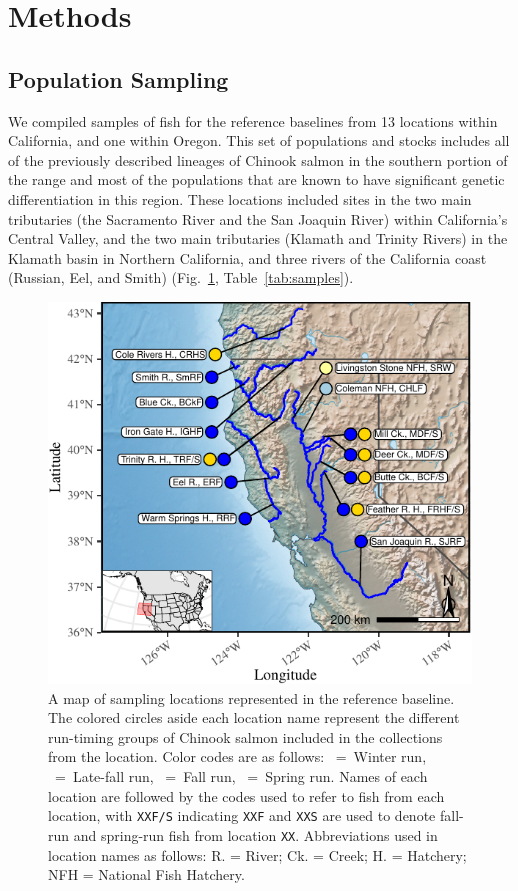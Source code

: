  \section*{Methods}

\subsection*{Population Sampling}

We compiled samples of fish for the reference baselines from 13 locations within California, and one
within Oregon. This set of populations and stocks includes all of the previously described lineages of Chinook salmon in the southern portion of the range and most of the populations that are known to have significant genetic differentiation in this region.
These locations included sites in the two
main tributaries (the Sacramento River and the San Joaquin River) within
California's Central Valley, and the two main tributaries (Klamath and Trinity Rivers) in the Klamath basin in Northern California, and
three rivers of the California coast (Russian, Eel, and Smith)
(Fig.~\ref{fig:map}, Table~\ref{tab:samples}).
\begin{figure}
\newcommand{\mapcap}{\footnotesize  A map of sampling locations represented in the reference
baseline.  The colored circles aside
each location name represent the different run-timing groups of Chinook salmon
included in the collections from the location.  Color codes are as follows: \Wball~=~Winter run,
\LFball{}~=~Late-fall run, \Fball~=~Fall run, \Sball~=~Spring run.
Names of each location are followed by the codes used to refer to fish from each location, with
{\tt XXF/S} indicating {\tt XXF} and {\tt XXS} are used to denote fall-run and spring-run fish
from location {\tt XX}.  Abbreviations used in location names as follows: R. = River; Ck. = Creek; H. = Hatchery; NFH = National Fish Hatchery.}
\begin{center}
\includegraphics[width=\columnwidth]{images/map-crop.pdf}
\end{center}
\caption[\mapcap]{\mapcap}
\label{fig:map}
\end{figure}

